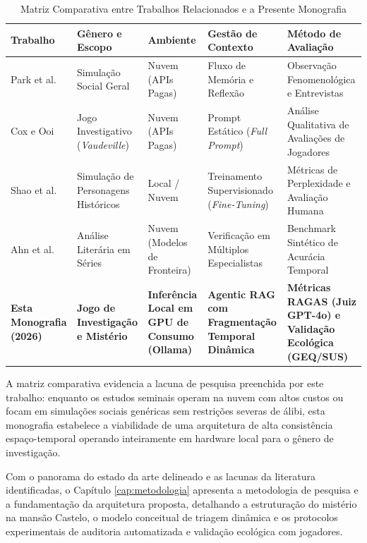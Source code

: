 \begin{table}[htbp]
\centering
\caption{Matriz Comparativa entre Trabalhos Relacionados e a Presente Monografia}
\vspace{0.2cm}
\label{tab:trabalhos_relacionados}
\footnotesize
\renewcommand{\arraystretch}{1.3}
\begin{tabularx}{\textwidth}{|>{\hsize=0.8\hsize}X|>{\hsize=0.9\hsize}X|>{\hsize=0.85\hsize}X|>{\hsize=1.15\hsize}X|>{\hsize=1.3\hsize}X|}
\hline
\textbf{Trabalho} & \textbf{Gênero e Escopo} & \textbf{Ambiente} & \textbf{Gestão de Contexto} & \textbf{Método de Avaliação} \\ \hline
Park et al. \cite{park2023generative} & Simulação Social Geral & Nuvem (APIs Pagas) & Fluxo de Memória e Reflexão & Observação Fenomenológica e Entrevistas \\ \hline
Cox e Ooi \cite{cox2023conversational} & Jogo Investigativo (\textit{Vaudeville}) & Nuvem (APIs Pagas) & Prompt Estático (\textit{Full Prompt}) & Análise Qualitativa de Avaliações de Jogadores \\ \hline
Shao et al. \cite{shao2023character} & Simulação de Personagens Históricos & Local / Nuvem & Treinamento Supervisionado (\textit{Fine-Tuning}) & Métricas de Perplexidade e Avaliação Humana \\ \hline
Ahn et al. \cite{ahn2024timechara} & Análise Literária em Séries & Nuvem (Modelos de Fronteira) & Verificação em Múltiplos Especialistas & Benchmark Sintético de Acurácia Temporal \\ \hline
\textbf{Esta Monografia (2026)} & \textbf{Jogo de Investigação e Mistério} & \textbf{Inferência Local em GPU de Consumo (Ollama)} & \textbf{Agentic RAG com Fragmentação Temporal Dinâmica} & \textbf{Métricas RAGAS (Juiz GPT-4o) e Validação Ecológica (GEQ/SUS)} \\ \hline
\end{tabularx}
\end{table}

A matriz comparativa evidencia a lacuna de pesquisa preenchida por este trabalho: enquanto os estudos seminais operam na nuvem com altos custos ou focam em simulações sociais genéricas sem restrições severas de álibi, esta monografia estabelece a viabilidade de uma arquitetura de alta consistência espaço-temporal operando inteiramente em hardware local para o gênero de investigação.

Com o panorama do estado da arte delineado e as lacunas da literatura identificadas, o Capítulo \ref{cap:metodologia} apresenta a metodologia de pesquisa e a fundamentação da arquitetura proposta, detalhando a estruturação do mistério na mansão Castelo, o modelo conceitual de triagem dinâmica e os protocolos experimentais de auditoria automatizada e validação ecológica com jogadores.
